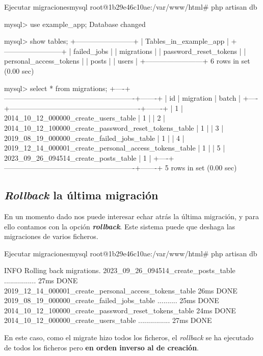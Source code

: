 \begin{mycode}{Ejecutar migraciones}{mysql}{}
root@1b29e46c10ae:/var/www/html# php artisan db

mysql> use example_app;
Database changed

mysql> show tables;
+------------------------+
| Tables_in_example_app  |
+------------------------+
| failed_jobs            |
| migrations             |
| password_reset_tokens  |
| personal_access_tokens |
| posts                  |
| users                  |
+------------------------+
6 rows in set (0.00 sec)

mysql> select * from migrations;
+----+-------------------------------------------------------+-------+
| id | migration                                             | batch |
+----+-------------------------------------------------------+-------+
|  1 | 2014_10_12_000000_create_users_table                  |     1 |
|  2 | 2014_10_12_100000_create_password_reset_tokens_table  |     1 |
|  3 | 2019_08_19_000000_create_failed_jobs_table            |     1 |
|  4 | 2019_12_14_000001_create_personal_access_tokens_table |     1 |
|  5 | 2023_09_26_094514_create_posts_table                  |     1 |
+----+-------------------------------------------------------+-------+
5 rows in set (0.00 sec)
\end{mycode}


\subsection{\textit{Rollback} la última migración}

En un momento dado nos puede interesar echar atrás la última migración, y para ello contamos con la opción \textbf{\textit{rollback}}. Este sistema puede que deshaga las migraciones de varios ficheros.

\begin{mycode}{Ejecutar migraciones}{mysql}{}
root@1b29e46c10ae:/var/www/html# php artisan db

INFO  Rolling back migrations.
2023_09_26_094514_create_posts_table ................  27ms DONE
2019_12_14_000001_create_personal_access_tokens_table  26ms DONE
2019_08_19_000000_create_failed_jobs_table ..........  25ms DONE
2014_10_12_100000_create_password_reset_tokens_table   24ms DONE
2014_10_12_000000_create_users_table ................  27ms DONE
\end{mycode}

En este caso, como el migrate hizo todos los ficheros, el \textit{rollback} se ha ejecutado de todos los ficheros pero \textbf{en orden inverso al de creación}.


